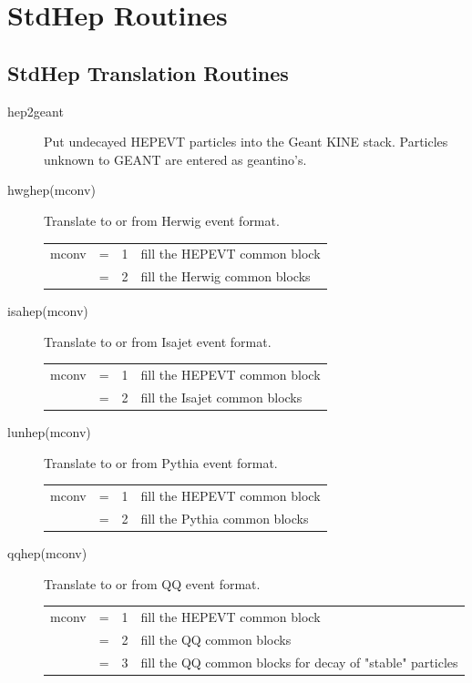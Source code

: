 
\section { StdHep Routines}
\label{routines}

\subsection {StdHep Translation Routines}
\label{conversion routines}

\begin{description}
\item[hep2geant]
  Put undecayed HEPEVT particles into the Geant KINE stack.
  Particles unknown to GEANT are entered as geantino's.
\item[hwghep(mconv)] Translate to or from Herwig event format.

\begin{tabular}{lcll}
mconv & = & 1 & fill the HEPEVT common block \\
      & = & 2 & fill the Herwig common blocks \\
\end{tabular}

\item[isahep(mconv)] Translate to or from Isajet event format.

\begin{tabular}{lcll}
mconv & = & 1 & fill the HEPEVT common block \\
      & = & 2 & fill the Isajet common blocks \\
\end{tabular}

\item[lunhep(mconv)] Translate to or from Pythia event format.

\begin{tabular}{lcll}
mconv & = & 1 & fill the HEPEVT common block \\
      & = & 2 & fill the Pythia common blocks \\
\end{tabular}

\item[qqhep(mconv)] Translate to or from QQ event format.

\begin{tabular}{lcll}
mconv & = & 1 & fill the HEPEVT common block \\
      & = & 2 & fill the QQ common blocks \\
      & = & 3 & fill the QQ common blocks for decay of "stable" particles \\
\end{tabular}


\end{description}
